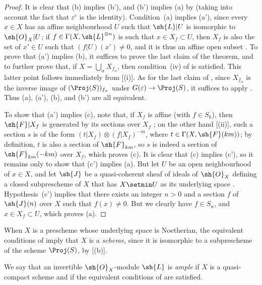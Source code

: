 \begin{proof}
  It is clear that (b) implies (b'), and (b') implies (a) by  (taking into account the fact that $\varepsilon^\flat$ is the identity).
  Condition~(a) implies (a'), since every $x\in X$ has an affine neighbourhood $U$ such that $\sh{L}|U$ is isomorphic to $\sh{O}_X|U$;
  if $f\in\Gamma(X,\sh{L}^{\otimes n})$ is such that $x\in X_f\subset U$, then $X_f$ is also the set of $x'\in U$ such that $(f|U)(x')\neq0$, and it is thus an affine open subset .
  To prove that (a') implies (b), it suffices to prove the last claim of the theorem, and to further prove that, if $X=\bigcup_\alpha X_{f_\alpha}$, then condition~(iv) of  is satisfied.
  This latter point follows immediately from [(i)].
  As for the last claim of , since $X_{f_\alpha}$ is the inverse image of $(\Proj(S))_{f_\alpha}$ under $G(\varepsilon)\to\Proj(S)$, it suffices to apply .
  Thus (a), (a'), (b), and (b') are all equivalent.

  To show that (a') implies (c), note that, if $X_f$ is affine (with $f\in S_k$), then $\sh{F}|X_f$ is generated by its sections over $X_f$ ;
  on the other hand [(ii)], such a section $s$ is of the form $(t|X_f)\otimes(f|X_f)^{-m}$, where $t\in\Gamma(X,\sh{F}(km))$;
  by definition, $t$ is also a section of $\sh{F}_{km}$, so $s$ is indeed a section of $\sh{F}_{km}(-km)$ over $X_f$, which proves (c).
  It is clear that (c) implies (c'), so it remains only to show that (c') implies (a).
  But let $U$ be an open neighbourhood of $x\in X$, and let $\sh{J}$ be a quasi-coherent sheaf of ideals of $\sh{O}_X$ defining a closed subprescheme of $X$ that has $X\setmin U$ as its underlying space .
  Hypothesis~(c') implies that there exists an integer $n>0$ and a section $f$ of $\sh{J}(n)$ over $X$ such that $f(x)\neq0$.
  But we clearly have $f\in S_n$, and $x\in X_f\subset U$, which proves (a).
\end{proof}

When $X$ is a prescheme whose underlying space is Noetherian, the equivalent conditions of  imply that $X$ is a \emph{scheme}, since it is isomorphic to a subprescheme of the scheme $\Proj(S)$, by [(b)].

\begin{definition}[4.5.3]
\label{II.4.5.3}
We say that an invertible $\sh{O}_X$-module $\sh{L}$ is \emph{ample} if $X$ is a quasi-compact scheme and if the equivalent conditions of  are satisfied.
\end{definition}

